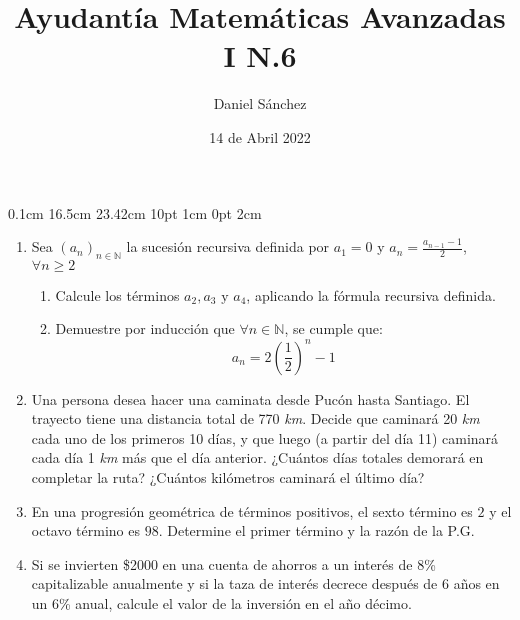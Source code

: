\documentclass[12pt]{article}
\newcommand{\D}{\displaystyle}
\begin{document}
\setmargins{2.5cm}
{0.1cm}
{16.5cm}
{23.42cm}
{10pt}
{1cm}
{0pt}
{2cm}

\title{Ayudant\'ia Matem\'aticas Avanzadas I N.6}
\date{14 de Abril 2022}
\author{Daniel S\'anchez}
\maketitle

\begin{enumerate}
      \item Sea $(a_n)_{n \in \mathbb{N}}$ la sucesi\'on recursiva definida por $a_1=0$ y
            $\D a_n=\frac{a_{n-1}-1}{2}$, $\forall n\geq 2$
            \begin{enumerate}
                  \item Calcule los t\'erminos $a_2,a_3 \mbox{ y } a_4$, aplicando la f\'ormula recursiva definida.
                  \item Demuestre por inducci\'on que $\forall n \in \mathbb{N}$, se cumple que:
                        $$a_n=2\left( \frac{1}{2} \right)^n - 1$$
            \end{enumerate}
      \item Una persona desea hacer una caminata desde Puc\'on hasta Santiago. El trayecto tiene una distancia
            total de 770 \textit{km}. Decide que caminar\'a 20 \textit{km} cada uno de los primeros 10 d\'ias,
            y que luego (a partir del d\'ia 11) caminar\'a cada d\'ia 1 \textit{km} m\'as que el d\'ia anterior.
            ¿Cu\'antos d\'ias totales demorar\'a en completar la ruta? ¿Cu\'antos kil\'ometros caminar\'a el \'ultimo
            d\'ia?
      \item En una progresi\'on geom\'etrica de t\'erminos positivos, el sexto t\'ermino es $2$ y el octavo t\'ermino es
            $98$. Determine el primer t\'ermino y la raz\'on de la P.G.
      \item Si se invierten \$2000 en una cuenta de ahorros a un inter\'es de 8\% capitalizable anualmente y si la
            taza de inter\'es decrece despu\'es de 6 años en un 6\% anual, calcule el valor de la inversi\'on en el año
            d\'ecimo.
\end{enumerate}
\end{document}
